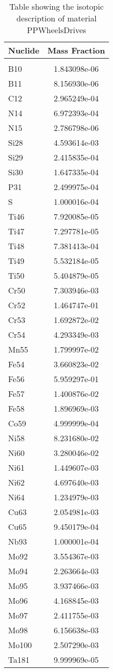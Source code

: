 \begin{centering}
\begin{table}[ht!]
\begin{tabular}{l | c}
\hline
Nuclide & Mass Fraction\\
\hline
\\
B10 & 1.843098e-06\\
B11 & 8.156930e-06\\
C12 & 2.965249e-04\\
N14 & 6.972393e-04\\
N15 & 2.786798e-06\\
Si28 & 4.593614e-03\\
Si29 & 2.415835e-04\\
Si30 & 1.647335e-04\\
P31 & 2.499975e-04\\
S & 1.000016e-04\\
Ti46 & 7.920085e-05\\
Ti47 & 7.297781e-05\\
Ti48 & 7.381413e-04\\
Ti49 & 5.532184e-05\\
Ti50 & 5.404879e-05\\
Cr50 & 7.303946e-03\\
Cr52 & 1.464747e-01\\
Cr53 & 1.692872e-02\\
Cr54 & 4.293349e-03\\
Mn55 & 1.799997e-02\\
Fe54 & 3.660823e-02\\
Fe56 & 5.959297e-01\\
Fe57 & 1.400876e-02\\
Fe58 & 1.896969e-03\\
Co59 & 4.999999e-04\\
Ni58 & 8.231680e-02\\
Ni60 & 3.280046e-02\\
Ni61 & 1.449607e-03\\
Ni62 & 4.697640e-03\\
Ni64 & 1.234979e-03\\
Cu63 & 2.054981e-03\\
Cu65 & 9.450179e-04\\
Nb93 & 1.000001e-04\\
Mo92 & 3.554367e-03\\
Mo94 & 2.263664e-03\\
Mo95 & 3.937466e-03\\
Mo96 & 4.168845e-03\\
Mo97 & 2.411755e-03\\
Mo98 & 6.156638e-03\\
Mo100 & 2.507290e-03\\
Ta181 & 9.999969e-05
\end{tabular}
\caption{Table showing the isotopic description of material PPWheelsDrives}
\label{table:material_PPWheelsDrives}
\end{table}\clearpage


\end{centering}

